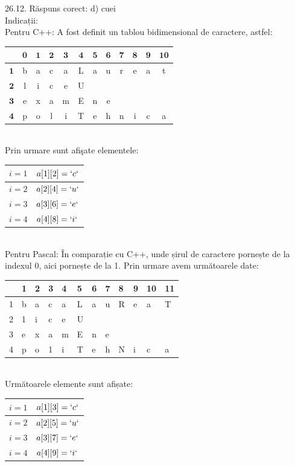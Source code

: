 26.12. Răspuns corect: d) cuei\\
Indicații:\\ Pentru C++: A fost definit un tablou bidimensional de caractere, astfel:\\ \begin{tabular}{|c|c|c|c|c|c|c|c|c|c|c|c|} \hline & $\mathbf{0}$ & $\mathbf{1}$ & $\mathbf{2}$ & $\mathbf{3}$ & $\mathbf{4}$ & $\mathbf{5}$ & $\mathbf{6}$ & $\mathbf{7}$ & $\mathbf{8}$ & $\mathbf{9}$ & $\mathbf{1 0}$ \\ \hline $\mathbf{1}$ & b & a & c & a & L & a & u & r & e & a & t \\ \hline $\mathbf{2}$ & l & i & c & e & U & & & & & & \\ \hline $\mathbf{3}$ & e & x & a & m & E & n & e & & & & \\ \hline $\mathbf{4}$ & p & o & l & i & T & e & h & n & i & c & a \\ \hline \end{tabular}\\ Prin urmare sunt afişate elementele:\\ \begin{tabular}{|l|l|} \hline $i=1$ & $a[1][2]=`c`$ \\ \hline $i=2$ & $a[2][4]=`u`$ \\ \hline $i=3$ & $a[3][6]=`e`$ \\ \hline $i=4$ & $a[4][8]=`i`$ \\ \hline \end{tabular}\\ Pentru Pascal: În comparație cu C++, unde șirul de caractere pornește de la indexul 0, aici pornește de la 1. Prin urmare avem următoarele date:\\ \begin{tabular}{|l|l|l|l|l|l|l|l|l|l|l|l|} \hline & 1 & 2 & 3 & 4 & 5 & 6 & 7 & 8 & 9 & 10 & 11 \\ \hline 1 & b & a & c & a & L & a & u & R & e & a & T \\ \hline 2 & 1 & i & c & e & U & & & & & & \\ \hline 3 & e & x & a & m & E & n & e & & & & \\ \hline 4 & p & o & 1 & i & T & e & h & N & i & c & a \\ \hline \end{tabular}\\ Următoarele elemente sunt afișate:\\ \begin{tabular}{|l|l|} \hline $i=1$ & $a[1][3]=`c`$ \\ \hline $i=2$ & $a[2][5]=`u`$\\ \hline $i=3$ & $a[3][7]=`e`$ \\ \hline $i=4$ & $a[4][9]=`i`$ \\ \hline \end{tabular}\\

